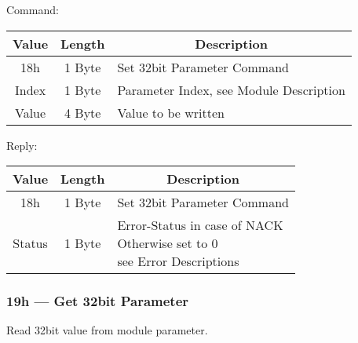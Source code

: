 Command:
\begin{table}[H]
    \centering
    \begin{tabular}{|c|c|l|}
        \hline
        \textbf{Value}   &   \textbf{Length} & \multicolumn{1}{|c|}{\textbf{Description}}\\ \hline \hline
        18h   &  1 Byte & Set 32bit Parameter Command \\ \hline
        Index & 1 Byte  & Parameter Index, see Module Description \\ \hline
        Value & 4 Byte & Value to be written\\ \hline
    \end{tabular}
\label{tab:CAN-18-C}
\end{table}
Reply:
\begin{table}[H]
    \centering
    \begin{tabular}{|c|c|l|}
        \hline
        \textbf{Value}   &   \textbf{Length} & \multicolumn{1}{|c|}{\textbf{Description}}\\ \hline \hline
        18h   &  1 Byte & Set 32bit Parameter Command \\ \hline
        Status & 1 Byte & \makecell[l]{Error-Status in case of NACK \\ Otherwise set to 0\\see Error Descriptions}\\ \hline
    \end{tabular}
\label{tab:CAN-18-R}
\end{table}
\subsubsection{19h --- Get 32bit Parameter}
Read 32bit value from module parameter.

